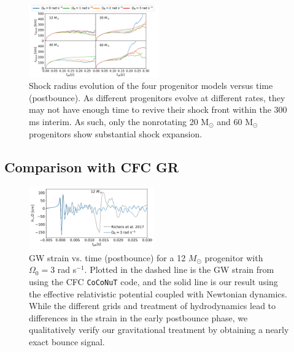 \documentclass[twocolumn,times]{aastex62}  %
\newcommand{\Msun}{\ensuremath{\mathrm{M}_\odot}\xspace}
\begin{document}
\begin{figure}[t]
    \centering
    \includegraphics[width = 0.5\textwidth]{M1_shock_mass_raster.pdf}
    \caption{Shock radius evolution of the four progenitor models versus time (postbounce).  As different progenitors evolve at different rates, they may not have enough time to revive their shock front within the 300 ms interim.  As such, only the nonrotating 20 \Msun and 60 \Msun progenitors show substantial shock expansion. }
    \label{fig:shock}
\end{figure} 

\subsection{Comparison with CFC GR}

 \begin{figure}[t]
    \centering
    \includegraphics[width=0.48\textwidth]{bounce_richers.pdf}
    \caption{GW strain vs. time (postbounce) for a 12 \(M_\odot\) progenitor \citep{woosley:2007} with $\Omega_0 = 3$ rad s$^{-1}$.  Plotted in the dashed line is the GW strain from \citet{richers:2017} using the CFC \texttt{CoCoNuT} code, and the solid line is our result using the effective relativistic potential coupled with Newtonian dynamics.  While the different grids and treatment of hydrodynamics lead to differences in the strain in the early postbounce phase, we qualitatively verify our gravitational treatment by obtaining a nearly exact bounce signal. }
    \label{fig:bounce_cfc}
\end{figure}
\end{document}
